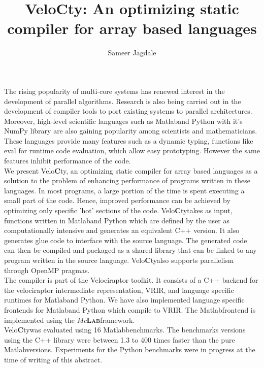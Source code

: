 \documentclass[a4paper, 12pt]{article}
\newcommand{\matlab}{{\textsc Matlab}\space}
\newcommand{\velocty}{{Velo\textbf{C}ty}\space}
\newcommand{\smclab}{\textrm{\textsl{Mc}\textbf{\textsc{Lab}}}}
\newcommand{\mclab}{\smclab\space}
\begin{document}
\title{\velocty : An optimizing static compiler for array based languages}
\author{Sameer Jagdale}
\maketitle
The rising popularity of multi-core systems has renewed interest in the development of parallel algorithms. Research is also being carried out in the development of compiler tools to port existing systems to parallel architectures. Moreover, high-level scientific languages such as \matlab and Python with it's NumPy library are also gaining popularity among scientists and mathematicians. These languages provide many features such as a dynamic typing, functions like eval for runtime code evaluation, which allow easy prototyping. However the same features inhibit performance of the code. \\
We present \velocty, an optimizing static compiler for array based languages as a solution to the problem of enhancing performance of programs written in these languages. In most programs, a large portion of the time is spent executing a small part of the code. Hence, improved performance can be achieved by optimizing only specific 'hot' sections of the code. \velocty takes as input, functions written in \matlab and Python which are defined by the user as computationally intensive and generates an equivalent C++ version. It also generates glue code to interface with the source language. The generated code can then be compiled and packaged as a shared library that can be linked to any program written in the source language. \velocty also supports parallelism through OpenMP pragmas.\\
The compiler is part of the Velociraptor toolkit. It consists of a C++ backend for the velociraptor intermediate representation, VRIR, and language specific runtimes for \matlab and Python. We have also implemented language specific frontends for \matlab and Python which compile to VRIR. The \matlab frontend is implemented using the \mclab framework. \\
\velocty was evaluated using 16 \matlab benchmarks. The benchmarks versions using the C++ library were between 1.3 to 400 times faster than the pure \matlab versions. Experiments for the Python benchmarks were in progress at the time of writing of this abstract.  
\end{document}
